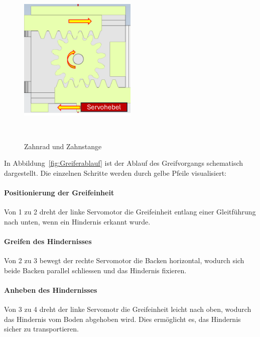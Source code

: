 \documentclass[main.tex]{subfiles} %
\begin{document}
\begin{figure}[H]
    \centering
    \includegraphics[width=0.5\textwidth]{Zahnrad_und_Zahnstange.png}
    \caption{Zahnrad und Zahnstange}~\label{fig:Zahnrad und Zahnstange}
\end{figure}


In Abbildung~\ref{fig:Greiferablauf} ist der Ablauf des Greifvorgangs schematisch dargestellt. Die einzelnen Schritte werden durch gelbe Pfeile visualisiert:

\paragraph{Positionierung der Greifeinheit} 
Von 1 zu 2 dreht der linke Servomotor die Greifeinheit entlang einer Gleitführung nach unten, wenn ein Hindernis erkannt wurde.

\paragraph{Greifen des Hindernisses} 

Von 2 zu 3 bewegt der rechte Servomotor die Backen horizontal, wodurch sich beide Backen parallel schliessen und das Hindernis fixieren.

\paragraph{Anheben des Hindernisses} 

Von 3 zu 4 dreht der linke Servomotr die Greifeinheit leicht nach oben, wodurch das Hindernis vom Boden abgehoben wird. 
Dies ermöglicht es, das Hindernis sicher zu transportieren.
\end{document}

